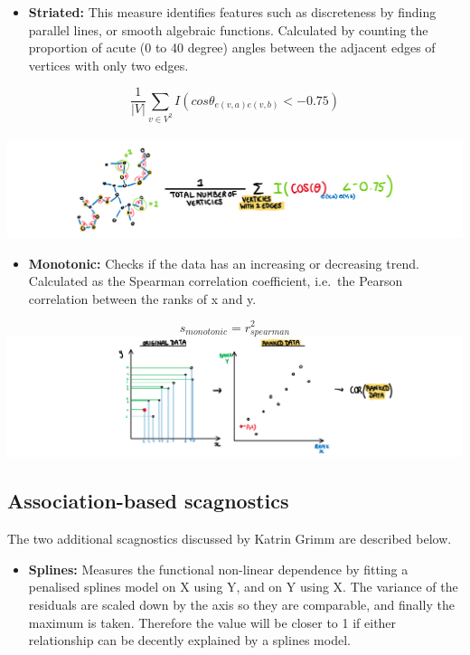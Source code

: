\begin{itemize}
\tightlist
\item
  \textbf{Striated:} This measure identifies features such as
  discreteness by finding parallel lines, or smooth algebraic functions.
  Calculated by counting the proportion of acute (0 to 40 degree) angles
  between the adjacent edges of vertices with only two edges.
\end{itemize}

\[\frac1{|V|}\sum_{v \in V^{2}}I(cos\theta_{e(v,a)e(v,b)}<-0.75)\]\\
\includegraphics{figures/drawstriated.png}

\begin{itemize}
\tightlist
\item
  \textbf{Monotonic:} Checks if the data has an increasing or decreasing
  trend. Calculated as the Spearman correlation coefficient, i.e.~the
  Pearson correlation between the ranks of x and y.
\end{itemize}

\[s_{monotonic} = r^2_{spearman}\]
\includegraphics{figures/drawmonotonic.png}

\hypertarget{association-based-scagnostics}{%
\subsection{Association-based
scagnostics}\label{association-based-scagnostics}}

The two additional scagnostics discussed by Katrin Grimm are described
below.

\begin{itemize}
\tightlist
\item
  \textbf{Splines:} Measures the functional non-linear dependence by
  fitting a penalised splines model on X using Y, and on Y using X. The
  variance of the residuals are scaled down by the axis so they are
  comparable, and finally the maximum is taken. Therefore the value will
  be closer to 1 if either relationship can be decently explained by a
  splines model.
\end{itemize}


